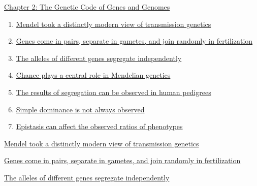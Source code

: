 \documentclass[12pt,letterpaper]{article}
\begin{document}
\begin{chapbox}{\hyperlink{home}{Chapter 2: The Genetic Code of Genes
    and Genomes}}
    \begin{enumerate}
        \item \hyperlink{2.1}{Mendel took a distinctly modern view of transmission genetics}
        \item \hyperlink{2.2}{Genes come in pairs, separate in gametes, and join randomly in fertilization}
        \item \hyperlink{2.3}{The alleles of different genes segregate independently}
        \item \hyperlink{2.4}{Chance plays a central role in Mendelian genetics}
        \item \hyperlink{2.5}{The results of segregation can be observed in human pedigrees}
        \item \hyperlink{2.6}{Simple dominance is not always observed}
        \item \hyperlink{2.7}{Epistasis can affect the observed ratios of phenotypes}
    \end{enumerate}
\end{chapbox}
\hypertarget{2.1}{}
\begin{secbox}{\hyperlink{2}{Mendel took a distinctly modern view of transmission genetics}}{

}\end{secbox}
\hypertarget{2.2}{}
\begin{secbox}{\hyperlink{2}{Genes come in pairs, separate in gametes, and join randomly in fertilization}}{

}\end{secbox}
\hypertarget{2.3}{}
\begin{secbox}{\hyperlink{2}{The alleles of different genes segregate independently}}{

}\end{secbox}
\end{document}
